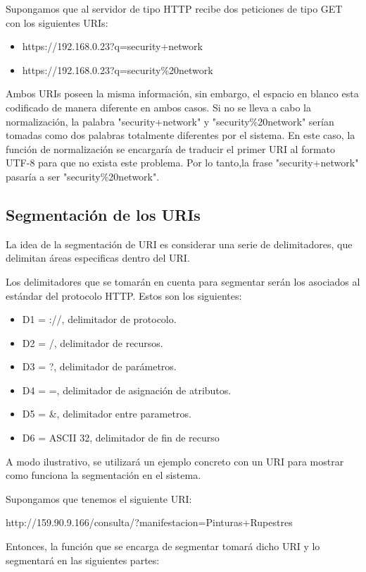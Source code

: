 Supongamos que al servidor de tipo HTTP recibe dos peticiones de tipo GET con los siguientes URIs:

\begin{itemize}
\item https://192.168.0.23?q=security+network
\item https://192.168.0.23?q=security\%20network
\end{itemize}
Ambos URIs poseen la misma información, sin embargo, el espacio en blanco esta codificado de manera diferente en ambos casos. Si no se lleva a cabo la normalización, la palabra "security+network" y "security\%20network" serían tomadas como dos palabras totalmente diferentes por el sistema. En este caso, la función de normalización se encargaría de traducir el primer URI al formato UTF-8 para que no exista este problema. Por lo tanto,la frase "security+network" pasaría a ser  "security\%20network".


\subsection*{Segmentación de los URIs}
\label{sec:delimitadores}

La idea de la segmentación de URI es considerar una serie de delimitadores, que delimitan áreas especificas dentro del URI.

Los delimitadores que se tomarán en cuenta para segmentar serán los asociados al estándar del protocolo HTTP. Estos son los siguientes:

\begin{itemize}
\item D1 = ://, delimitador de protocolo.
\item D2 = /, delimitador de recursos.
\item D3 = ?, delimitador de parámetros.
\item D4 = =, delimitador de asignación de atributos.
\item D5 = \&, delimitador entre parametros.
\item D6 = ASCII 32, delimitador de fin de recurso
\end{itemize}

A modo ilustrativo, se utilizará un ejemplo concreto con un URI para mostrar como funciona la segmentación en el sistema.

Supongamos que tenemos el siguiente URI:

http://159.90.9.166/consulta/?manifestacion=Pinturas+Rupestres

Entonces, la función que se encarga de segmentar tomará dicho URI y lo segmentará en las siguientes partes:

